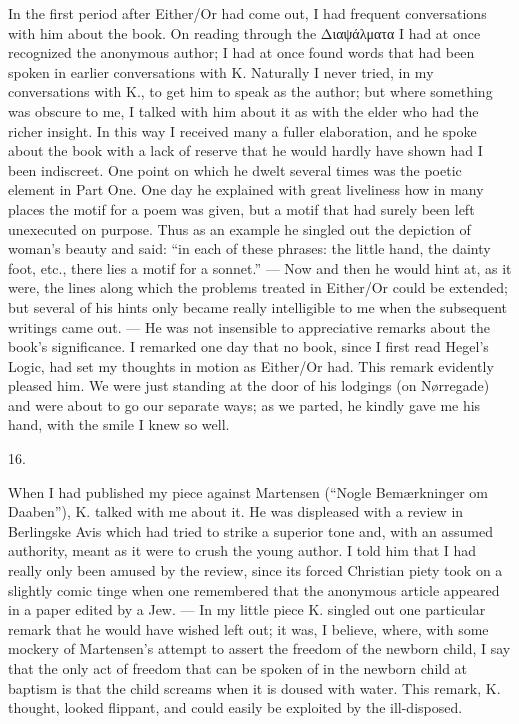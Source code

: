 \documentclass[12pt,a4paper,openany]{book}
\newcommand{\secnum}[1]{\par\begin{center}#1\end{center}\par\nobreak}
\newcommand{\opage}[1]{\marginnote{\footnotesize\textit{[#1]}}}
\begin{document}
In the first period after Either/Or had come out, I had frequent
conversations with him about the book. On reading through the Διαψάλματα
I had at once recognized the anonymous author; I had at once found words
that had been spoken in earlier conversations with K. Naturally I never
tried, in my conversations with K., to get him to speak as the author; but
where something was obscure to me, I talked with him about it as with the
elder who had the richer insight. In this way I received many a fuller
elaboration, and he spoke about the book with a lack of reserve that he
would hardly have shown had I been indiscreet. One point on which he dwelt
several times was the poetic element in Part One. One day he explained
with great liveliness how in many places the motif for a poem was given,
but a motif that had surely been left unexecuted on purpose. Thus as an
example he singled out the depiction of woman's beauty and said:
``in each of these phrases: the little hand, the dainty foot, etc., there
lies a motif for a sonnet.'' --- Now and
\opage{349}then he would hint at, as it were, the lines along which the
problems treated in Either/Or could be extended; but several of his hints
only became really intelligible to me when the subsequent writings came
out. --- He was not insensible to appreciative remarks about the book's
significance. I remarked one day that no book, since I first read Hegel's
Logic, had set my thoughts in motion as Either/Or had. This remark
evidently pleased him. We were just standing at the door of his lodgings
(on Nørregade) and were about to go our separate ways; as we parted, he
kindly gave me his hand, with the smile I knew so well.

\secnum{16.}

When I had published my piece against Martensen (``Nogle Bemærkninger om
Daaben''), K. talked with me about it. He was displeased with a review in
Berlingske Avis which had tried to strike a superior tone and, with an
assumed authority, meant as it were to crush the young author. I told him
that I had really only been amused by the review, since its forced
Christian piety took on a slightly comic tinge when one remembered that
the anonymous article appeared in a paper edited by a Jew. --- In my
little piece K. singled out one particular remark that he would have
wished left out; it was, I believe, where, with some mockery of
Martensen's attempt to assert the freedom of the newborn child, I say that
the only act of freedom that can be spoken of in the newborn child at
baptism is that the child screams when it is doused with water. This
remark, K. thought, looked flippant, and could easily be exploited by the
ill-disposed.
\end{document}
